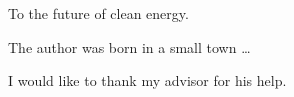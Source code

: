 \begin{abstract}
  \lipsum[1-6]
\end{abstract}

\makecopyrightpage

\maketitlepage

\begin{dedication}
  \centering To the future of clean energy.
\end{dedication}

\begin{biography}
  The author was born in a small town \ldots
\end{biography}

\begin{acknowledgements}
  I would like to thank my advisor for his help.
\end{acknowledgements}

\thesistableofcontents

\thesislistoftables

\thesislistoffigures
